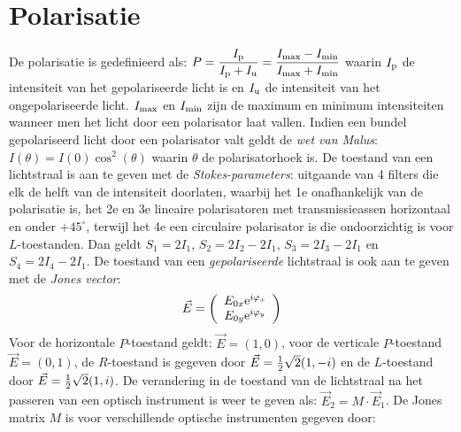 \documentclass[twoside]{report}
\begin{document}
\section{Polarisatie}
De polarisatie is gedefinieerd als:
$\displaystyle
P=\frac{I_{\rm p}}{I_{\rm p}+I_{\rm u}}=\frac{I_{\rm max}-I_{\rm min}}{I_{\rm max}+I_{\rm min}}
$
\npar
waarin $I_{\rm p}$ de intensiteit van het gepolariseerde licht is en $I_{\rm u}$
de intensiteit van het ongepolariseerde licht. $I_{\rm max}$ en $I_{\rm min}$
zijn de maximum en minimum intensiteiten wanneer men het licht door een
polarisator laat vallen. Indien een bundel gepolariseerd licht door een
polarisator valt geldt de {\it wet van Malus}: $I(\theta)=I(0)\cos^2(\theta)$
waarin $\theta$ de polarisatorhoek is.
\npar
De toestand van een lichtstraal is aan te geven met de {\it Stokes-parameters}:
uitgaande van 4 filters die elk de helft van de intensiteit doorlaten,
waarbij het 1e onafhankelijk van de polarisatie is, het 2e en 3e lineaire
polarisatoren met transmissieassen horizontaal en onder $+45^\circ$, terwijl
het 4e een circulaire polarisator is die ondoorzichtig is voor $L$-toestanden.
Dan geldt $S_1=2I_1$, $S_2=2I_2-2I_1$, $S_3=2I_3-2I_1$ en $S_4=2I_4-2I_1$.
\npar
De toestand van een {\it gepolariseerde} lichtstraal is ook aan te geven met
de {\it Jones vector}:
\[
\vec{E}=\left(\begin{array}{c}
E_{0x}{\rm e}^{i\varphi_x}\\
E_{0y}{\rm e}^{i\varphi_y}
\end{array}\right)
\]
Voor de horizontale $P$-toestand geldt: $\vec{E}=(1,0)$, voor de verticale
$P$-toestand $\vec{E}=(0,1)$, de $R$-toestand is gegeven door
$\vec{E}=\mbox{$\frac{1}{2}$}\sqrt{2}(1,-i)$ en de $L$-toestand door
$\vec{E}=\mbox{$\frac{1}{2}$}\sqrt{2}(1,i)$. De verandering in de toestand van de
lichtstraal na het passeren van een optisch instrument is weer te geven als:
$\vec{E}_2=M\cdot\vec{E}_1$. De Jones matrix $M$ is voor verschillende
optische instrumenten gegeven door:
\npar
\end{document}
